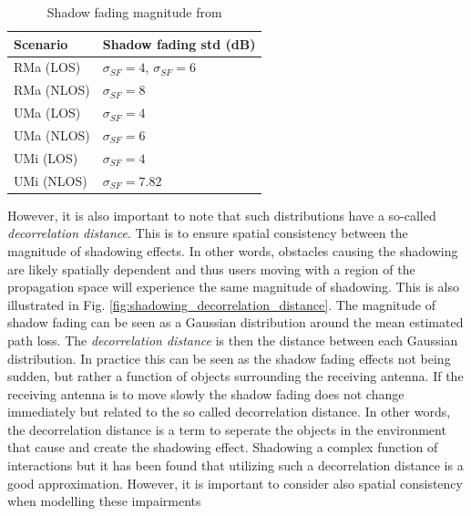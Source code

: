 \begin{table}[b]
\centering
\begin{tabular}{@{}ll@{}}
\toprule
Scenario   & Shadow fading std (dB)               \\ \midrule
RMa (LOS)  & $\sigma_{SF} = 4$, $\sigma_{SF} = 6$ \\
RMa (NLOS) & $\sigma_{SF} = 8$                    \\
UMa (LOS)  & $\sigma_{SF} = 4$                    \\
UMa (NLOS) & $\sigma_{SF} = 6$                    \\
UMi (LOS)  & $\sigma_{SF} = 4$                    \\
UMi (NLOS) & $\sigma_{SF} = 7.82$                 \\ \bottomrule
\end{tabular}
\caption{Shadow fading magnitude from \cite{3GPP38901}}\label{tab:sigma_SF}
\end{table}

However, it is also important to note that such distributions have a so-called \emph{decorrelation distance}. This is to ensure spatial consistency between the magnitude of shadowing effects. In other words, obstacles causing the shadowing are likely spatially dependent and thus users moving with a region of the propagation space will experience the same magnitude of shadowing. This is also illustrated in Fig. \ref{fig:shadowing_decorrelation_distance}. The magnitude of shadow fading can be seen as a Gaussian distribution around the mean estimated path loss. The \emph{decorrelation distance} is then the distance between each Gaussian distribution. In practice this can be seen as the shadow fading effects not being sudden, but rather a function of objects surrounding the receiving antenna. If the receiving antenna is to move slowly the shadow fading does not change immediately but related to the so called decorrelation distance. In other words, the decorrelation distance is a term to seperate the objects in the environment that cause and create the shadowing effect. Shadowing a complex function of interactions but it has been found that utilizing such a decorrelation distance is a good approximation. However, it is important to consider also spatial consistency when modelling these impairments


